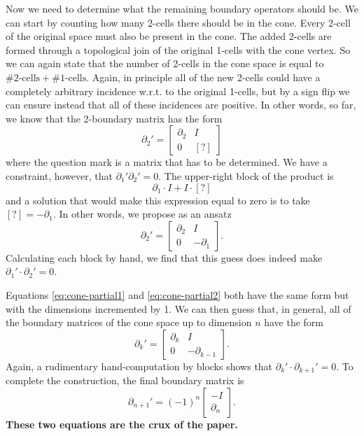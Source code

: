 \documentclass[twocolumn]{article}
\begin{document}
Now we need to determine what the remaining boundary operators should be.
We can start by counting how many 2-cells there should be in the cone.
Every 2-cell of the original space must also be present in the cone.
The added 2-cells are formed through a topological join of the original 1-cells with the cone vertex.
So we can again state that the number of 2-cells in the cone space is equal to $\#\text{2-cells} + \#\text{1-cells}$.
Again, in principle all of the new 2-cells could have a completely arbitrary incidence w.r.t. to the original 1-cells, but by a sign flip we can ensure instead that all of these incidences are positive.
In other words, so far, we know that the 2-boundary matrix has the form
\begin{equation}
    \partial_2' = \left[\begin{matrix}\partial_2 & I \\ 0 & [?]\end{matrix}\right]
\end{equation}
where the question mark is a matrix that has to be determined.
We have a constraint, however, that $\partial_1'\partial_2' = 0$.
The upper-right block of the product is
\begin{equation}
    \partial_1\cdot I + I\cdot [?]
\end{equation}
and a solution that would make this expression equal to zero is to take $[?] = -\partial_1$.
In other words, we propose as an ansatz
\begin{equation}
    \partial_2' = \left[\begin{matrix}\partial_2 & I \\ 0 & -\partial_1\end{matrix}\right].
    \label{eq:cone-partial2}
\end{equation}
Calculating each block by hand, we find that this guess does indeed make $\partial_1'\cdot\partial_2' = 0$.

Equations \eqref{eq:cone-partial1} and \eqref{eq:cone-partial2} both have the same form but with the dimensions incremented by 1.
We can then guess that, in general, all of the boundary matrices of the cone space up to dimension $n$ have the form
\begin{equation}
    \partial_k' = \left[\begin{matrix}\partial_k & I \\ 0 & -\partial_{k - 1}\end{matrix}\right].
    \label{eq:cone-partial-k}
\end{equation}
Again, a rudimentary hand-computation by blocks shows that $\partial_k'\cdot\partial_{k + 1}' = 0$.
To complete the construction, the final boundary matrix is
\begin{equation}
    \partial_{n + 1}' = (-1)^n\left[\begin{matrix}-I \\ \partial_n\end{matrix}\right].
    \label{eq:cone-partial-n+1}
\end{equation}
\textbf{These two equations are the crux of the paper.}
\end{document}

